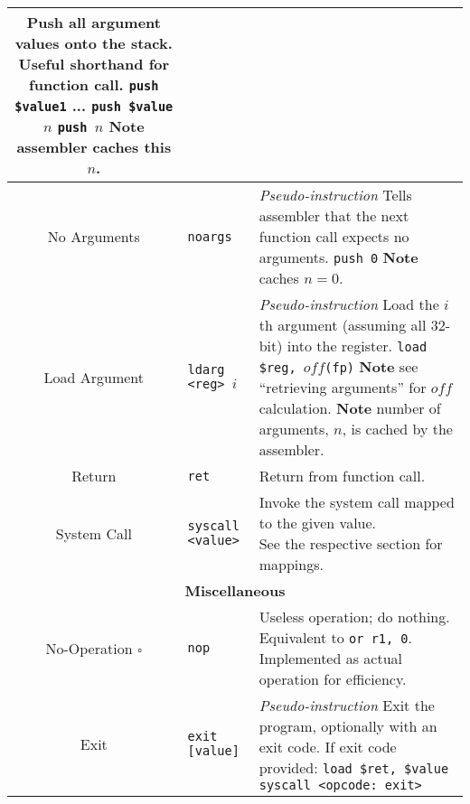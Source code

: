 \documentclass{article}
\begin{document}
\begin{longtable}{|c|l|l|}
{    Push all argument values onto the stack.\\%
    Useful shorthand for function call.\\%
    \texttt{push \$value1}\\%
    ...\\%
    \texttt{push \$value\(n\)}\\%
    \texttt{push \(n\)}\\%
    \textbf{Note} assembler caches this \(n\).} \\
    \hline
    No Arguments & \texttt{noargs} & \makecell[l]{\textit{Pseudo-instruction}\\%
    Tells assembler that the next function call expects no arguments.\\%
    \texttt{push 0}\\%
    \textbf{Note} caches \(n = 0\).} \\
    \hline
    Load Argument & \texttt{ldarg <reg> \(i\)} & \makecell[l]{\textit{Pseudo-instruction}\\%
    Load the \(i\)th argument (assuming all 32-bit) into the register.\\%
    \texttt{load \$reg, \(off\)(fp)}\\%
    \textbf{Note} see ``retrieving arguments'' for \(off\) calculation.\\%
    \textbf{Note} number of arguments, \(n\), is cached by the assembler.} \\
    \hline
    Return & \texttt{ret} & Return from function call. \\
    \hline
    System Call & \texttt{syscall <value>} & \makecell[l]{Invoke the system call mapped to the given value.\\%
    See the respective section for mappings.} \\
    \hline \hline
    \multicolumn{3}{|c|}{\textbf{Miscellaneous}} \\
    \hline
    No-Operation \(\square\) & \texttt{nop} & \makecell[l]{Useless operation; do nothing.\\%
    Equivalent to \texttt{or r1, 0}.\\%
    Implemented as actual operation for efficiency.} \\
    \hline
    Exit & \texttt{exit [value]} & \makecell[l]{\textit{Pseudo-instruction}\\%
    Exit the program, optionally with an exit code.\\%
    If exit code provided: \texttt{load \$ret, \$value}\\%
    \texttt{syscall <opcode: exit>}} \\
    \hline
\end{longtable}
\end{document}
